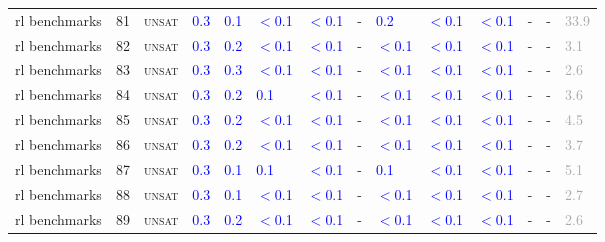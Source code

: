 \begin{center}
{\begin{longtable}{@{}llllllllllllll@{}}
rl benchmarks & 81 & \textsc{unsat} & \textcolor{blue}{0.3} & \textcolor{blue}{0.1} & \textcolor{blue}{$<$0.1} & \textcolor{blue}{$<$0.1} & - & \textcolor{blue}{0.2} & \textcolor{blue}{$<$0.1} & \textcolor{blue}{$<$0.1} & - & - & \textcolor{darkgray}{33.9} \\
rl benchmarks & 82 & \textsc{unsat} & \textcolor{blue}{0.3} & \textcolor{blue}{0.2} & \textcolor{blue}{$<$0.1} & \textcolor{blue}{$<$0.1} & - & \textcolor{blue}{$<$0.1} & \textcolor{blue}{$<$0.1} & \textcolor{blue}{$<$0.1} & - & - & \textcolor{darkgray}{3.1} \\
rl benchmarks & 83 & \textsc{unsat} & \textcolor{blue}{0.3} & \textcolor{blue}{0.3} & \textcolor{blue}{$<$0.1} & \textcolor{blue}{$<$0.1} & - & \textcolor{blue}{$<$0.1} & \textcolor{blue}{$<$0.1} & \textcolor{blue}{$<$0.1} & - & - & \textcolor{darkgray}{2.6} \\
rl benchmarks & 84 & \textsc{unsat} & \textcolor{blue}{0.3} & \textcolor{blue}{0.2} & \textcolor{blue}{0.1} & \textcolor{blue}{$<$0.1} & - & \textcolor{blue}{$<$0.1} & \textcolor{blue}{$<$0.1} & \textcolor{blue}{$<$0.1} & - & - & \textcolor{darkgray}{3.6} \\
rl benchmarks & 85 & \textsc{unsat} & \textcolor{blue}{0.3} & \textcolor{blue}{0.2} & \textcolor{blue}{$<$0.1} & \textcolor{blue}{$<$0.1} & - & \textcolor{blue}{$<$0.1} & \textcolor{blue}{$<$0.1} & \textcolor{blue}{$<$0.1} & - & - & \textcolor{darkgray}{4.5} \\
rl benchmarks & 86 & \textsc{unsat} & \textcolor{blue}{0.3} & \textcolor{blue}{0.2} & \textcolor{blue}{$<$0.1} & \textcolor{blue}{$<$0.1} & - & \textcolor{blue}{$<$0.1} & \textcolor{blue}{$<$0.1} & \textcolor{blue}{$<$0.1} & - & - & \textcolor{darkgray}{3.7} \\
rl benchmarks & 87 & \textsc{unsat} & \textcolor{blue}{0.3} & \textcolor{blue}{0.1} & \textcolor{blue}{0.1} & \textcolor{blue}{$<$0.1} & - & \textcolor{blue}{0.1} & \textcolor{blue}{$<$0.1} & \textcolor{blue}{$<$0.1} & - & - & \textcolor{darkgray}{5.1} \\
rl benchmarks & 88 & \textsc{unsat} & \textcolor{blue}{0.3} & \textcolor{blue}{0.1} & \textcolor{blue}{$<$0.1} & \textcolor{blue}{$<$0.1} & - & \textcolor{blue}{$<$0.1} & \textcolor{blue}{$<$0.1} & \textcolor{blue}{$<$0.1} & - & - & \textcolor{darkgray}{2.7} \\
rl benchmarks & 89 & \textsc{unsat} & \textcolor{blue}{0.3} & \textcolor{blue}{0.2} & \textcolor{blue}{$<$0.1} & \textcolor{blue}{$<$0.1} & - & \textcolor{blue}{$<$0.1} & \textcolor{blue}{$<$0.1} & \textcolor{blue}{$<$0.1} & - & - & \textcolor{darkgray}{2.6} \\

\end{longtable}}
\end{center}
